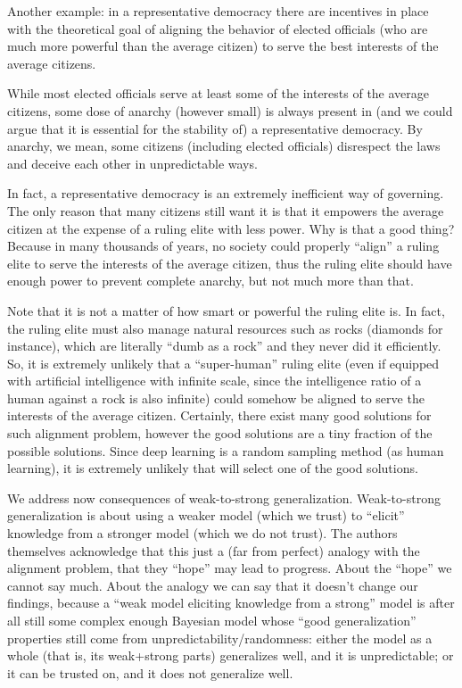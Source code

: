 \documentclass[11pt]{book}
\begin{document}
Another example: in a representative democracy there are incentives in
place with the theoretical goal of aligning the behavior of elected
officials (who are much more powerful than the average citizen) to serve
the best interests of the average citizens.

While most elected officials serve at least some of the interests of the
average citizens, some dose of anarchy (however small) is always present
in (and we could argue that it is essential for the stability of) a
representative democracy. By anarchy, we mean, some citizens (including
elected officials) disrespect the laws and deceive each other in
unpredictable ways.

In fact, a representative democracy is an extremely inefficient way of
governing. The only reason that many citizens still want it is that it
empowers the average citizen at the expense of a ruling elite with less
power. Why is that a good thing? Because in many thousands of years, no
society could properly ``align'' a ruling elite to serve the interests
of the average citizen, thus the ruling elite should have enough power
to prevent complete anarchy, but not much more than that.

Note that it is not a matter of how smart or powerful the ruling elite
is. In fact, the ruling elite must also manage natural resources such as
rocks (diamonds for instance), which are literally ``dumb as a rock''
and they never did it efficiently. So, it is extremely unlikely that a
``super-human'' ruling elite (even if equipped with artificial
intelligence with infinite scale, since the intelligence ratio of a
human against a rock is also infinite) could somehow be aligned to serve
the interests of the average citizen. Certainly, there exist many good
solutions for such alignment problem, however the good solutions are a
tiny fraction of the possible solutions. Since deep learning is a random
sampling method (as human learning), it is extremely unlikely that will
select one of the good solutions.

We address now consequences of weak-to-strong
generalization\cite{burns_weak--strong_2023}. Weak-to-strong generalization is about using a weaker model
(which we trust) to ``elicit'' knowledge from a stronger model (which we
do not trust). The authors themselves acknowledge that this just a (far
from perfect) analogy with the alignment problem, that they ``hope'' may
lead to progress. About the ``hope'' we cannot say much. About the
analogy we can say that it doesn't change our findings, because a ``weak
model eliciting knowledge from a strong'' model is after all still some
complex enough Bayesian model whose ``good generalization'' properties
still come from unpredictability/randomness: either the model as a whole
(that is, its weak+strong parts) generalizes well, and it is
unpredictable; or it can be trusted on, and it does not generalize well.
\end{document}
